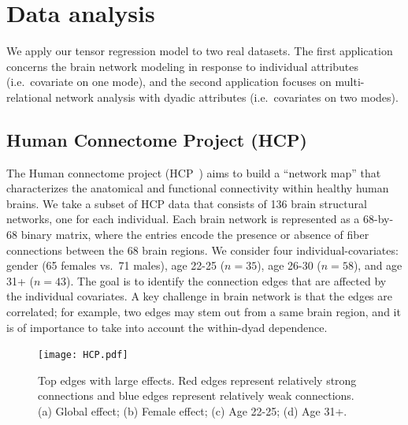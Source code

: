 \documentclass[12pt]{article}
\theoremstyle{plain}
\theoremstyle{definition}
\begin{document}
\section{Data analysis}
We apply our tensor regression model to two real datasets. The first application concerns the brain network modeling in response to individual attributes (i.e.\ covariate on one mode), and the second application focuses on multi-relational network analysis with dyadic attributes (i.e.\ covariates on two modes). 
\subsection{Human Connectome Project (HCP)}
The Human connectome project (HCP~\citep{HCP}) aims to build a ``network map'' that characterizes the anatomical and functional connectivity within healthy human brains. We take a subset of HCP data that consists of 136 brain structural networks, one for each individual. Each brain network is represented as a 68-by-68 binary matrix, where the entries encode the presence or absence of fiber connections between the 68 brain regions. We consider four individual-covariates: gender (65 females vs.\ 71 males), age 22-25 ($n=35$), age 26-30 ($n=58$), and age 31+ ($n=43$). The goal is to identify the connection edges that are affected by the individual covariates. A key challenge in brain network is that the edges are correlated; for example, two edges may stem out from a same brain region, and it is of importance to take into account the within-dyad dependence. 


\begin{figure}[hbt]
\centering
\texttt{[image: HCP.pdf]}
\caption{Top edges with large effects. Red edges represent relatively strong connections and blue edges represent relatively weak connections. (a) Global effect; (b) Female effect; (c) Age 22-25; (d) Age 31+.}\label{fig:brain}
\end{figure}
\end{document}
